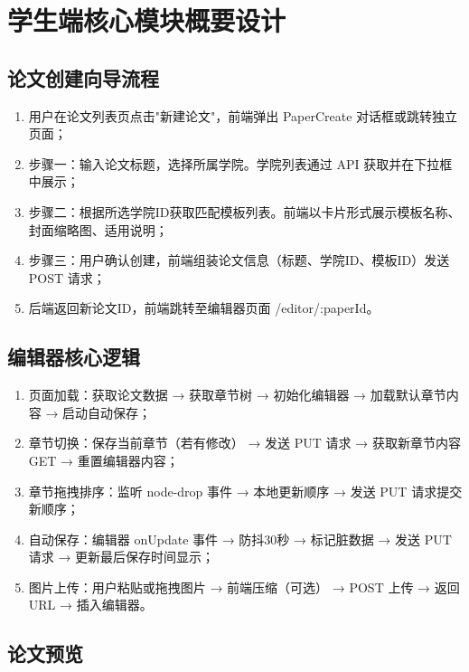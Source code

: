 \documentclass{../softeng}
\begin{document}
\section{学生端核心模块概要设计}

\subsection{论文创建向导流程}

\begin{enumerate}
    \item 用户在论文列表页点击"新建论文"，前端弹出 PaperCreate 对话框或跳转独立页面；
    \item 步骤一：输入论文标题，选择所属学院。学院列表通过 API 获取并在下拉框中展示；
    \item 步骤二：根据所选学院ID获取匹配模板列表。前端以卡片形式展示模板名称、封面缩略图、适用说明；
    \item 步骤三：用户确认创建，前端组装论文信息（标题、学院ID、模板ID）发送 POST 请求；
    \item 后端返回新论文ID，前端跳转至编辑器页面 /editor/:paperId。
\end{enumerate}

\subsection{编辑器核心逻辑}

\begin{enumerate}
    \item 页面加载：获取论文数据 → 获取章节树 → 初始化编辑器 → 加载默认章节内容 → 启动自动保存；
    \item 章节切换：保存当前章节（若有修改） → 发送 PUT 请求 → 获取新章节内容 GET → 重置编辑器内容；
    \item 章节拖拽排序：监听 node-drop 事件 → 本地更新顺序 → 发送 PUT 请求提交新顺序；
    \item 自动保存：编辑器 onUpdate 事件 → 防抖30秒 → 标记脏数据 → 发送 PUT 请求 → 更新最后保存时间显示；
    \item 图片上传：用户粘贴或拖拽图片 → 前端压缩（可选） → POST 上传 → 返回URL → 插入编辑器。
\end{enumerate}

\subsection{论文预览}
\end{document}

